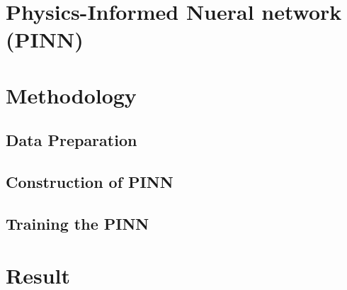 \documentclass{article}
\begin{document}
    \section{Physics-Informed Nueral network (PINN)}
    
    \section{Methodology}
    \subsection{Data Preparation}

    \subsection{Construction of PINN}

    \subsection{Training the PINN}

    \section{Result}


    \nocite{*}
    
    
\end{document}
